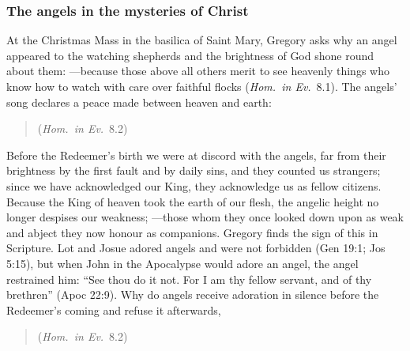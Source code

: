 \subsubsection{The angels in the mysteries of Christ}

At the Christmas Mass in the basilica of Saint Mary, Gregory asks why an
angel appeared to the watching shepherds and the brightness of God shone
round about them: ---because those
above all others merit to see heavenly things who know how to watch with
care over faithful flocks (\emph{Hom.\ in Ev.}\ 8.1). The angels' song
declares a peace made between heaven and earth:

\begin{quote}
 (\emph{Hom.\ in Ev.}\ 8.2)
\end{quote}

\noindent Before the Redeemer's birth we were at discord with the angels,
far from their brightness by the first fault and by daily sins, and they
counted us strangers; since we have acknowledged our King, they acknowledge
us as fellow citizens. Because the King of heaven took the earth of our
flesh, the angelic height no longer despises our weakness;
---those whom they once looked down upon as weak and abject they
now honour as companions. Gregory finds the sign of this in Scripture. Lot
and Josue adored angels and were not forbidden (Gen 19:1; Jos 5:15), but when
John in the Apocalypse would adore an angel, the angel restrained him:
``See thou do it not. For I am thy fellow servant, and of thy brethren''
(Apoc 22:9). Why do angels receive adoration in silence before the
Redeemer's coming and refuse it afterwards,

\begin{quote}
(\emph{Hom.\ in Ev.}\ 8.2)
\end{quote}


